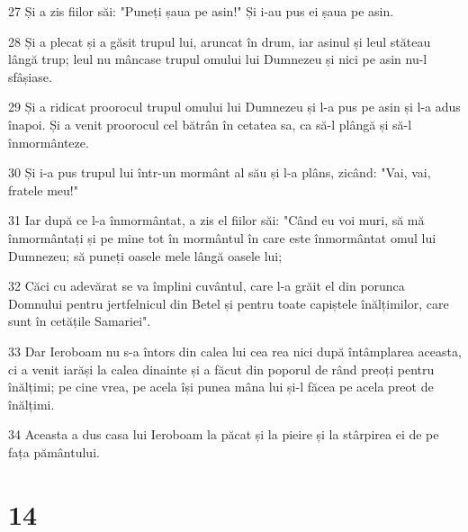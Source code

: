 \par 27 Și a zis fiilor săi: "Puneți șaua pe asin!" Și i-au pus ei șaua pe asin.
\par 28 Și a plecat și a găsit trupul lui, aruncat în drum, iar asinul și leul stăteau lângă trup; leul nu mâncase trupul omului lui Dumnezeu și nici pe asin nu-l sfâșiase.
\par 29 Și a ridicat proorocul trupul omului lui Dumnezeu și l-a pus pe asin și l-a adus înapoi. Și a venit proorocul cel bătrân în cetatea sa, ca să-l plângă și să-l înmormânteze.
\par 30 Și i-a pus trupul lui într-un mormânt al său și l-a plâns, zicând: "Vai, vai, fratele meu!"
\par 31 Iar după ce l-a înmormântat, a zis el fiilor săi: "Când eu voi muri, să mă înmormântați și pe mine tot în mormântul în care este înmormântat omul lui Dumnezeu; să puneți oasele mele lângă oasele lui;
\par 32 Căci cu adevărat se va împlini cuvântul, care l-a grăit el din porunca Domnului pentru jertfelnicul din Betel și pentru toate capiștele înălțimilor, care sunt în cetățile Samariei".
\par 33 Dar Ieroboam nu s-a întors din calea lui cea rea nici după întâmplarea aceasta, ci a venit iarăși la calea dinainte și a făcut din poporul de rând preoți pentru înălțimi; pe cine vrea, pe acela își punea mâna lui și-l făcea pe acela preot de înălțimi.
\par 34 Aceasta a dus casa lui Ieroboam la păcat și la pieire și la stârpirea ei de pe fața pământului.

\chapter{14}

